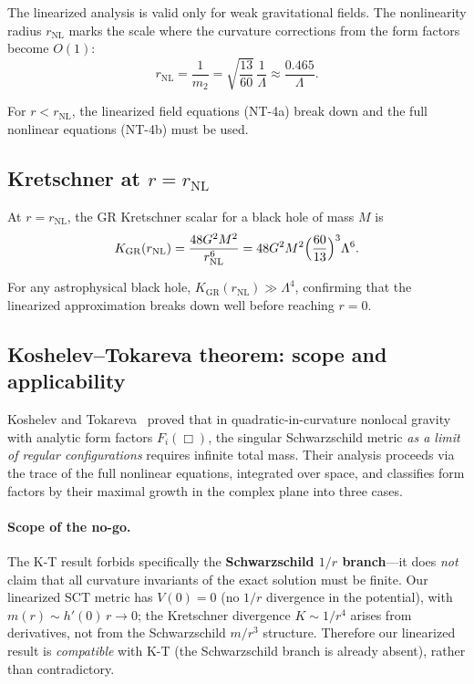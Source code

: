 \documentclass[11pt,a4paper]{article}
\theoremstyle{definition}
\theoremstyle{remark}
\newcommand{\Lam}{\Lambda}
\newcommand{\rNL}{r_{\mathrm{NL}}}
\begin{document}
The linearized analysis is valid only for weak gravitational fields. The nonlinearity
radius $\rNL$ marks the scale where the curvature corrections from the form factors
become $O(1)$:
\begin{equation}
  \rNL = \frac{1}{m_2} = \sqrt{\frac{13}{60}}\,\frac{1}{\Lam} \approx \frac{0.465}{\Lam}.
\end{equation}

For $r < \rNL$, the linearized field equations (NT-4a) break down and the full nonlinear
equations (NT-4b) must be used.

\subsection{Kretschner at $r = \rNL$}

At $r = \rNL$, the GR Kretschner scalar for a black hole of mass $M$ is
\begin{equation}
  K_{\mathrm{GR}}(\rNL) = \frac{48G^2M^2}{\rNL^6}
  = 48G^2M^2\Bigl(\frac{60}{13}\Bigr)^3\Lam^6.
\end{equation}

For any astrophysical black hole, $K_{\mathrm{GR}}(\rNL) \gg \Lam^4$, confirming
that the linearized approximation breaks down well before reaching $r = 0$.

\subsection{Koshelev--Tokareva theorem: scope and applicability}

Koshelev and Tokareva~\cite{KoshelevTokareva2024} proved that in quadratic-in-curvature
nonlocal gravity with analytic form factors $F_i(\Box)$, the singular Schwarzschild
metric \emph{as a limit of regular configurations} requires infinite total mass.
Their analysis proceeds via the trace of the full nonlinear equations, integrated
over space, and classifies form factors by their maximal growth in the complex plane
into three cases.

\paragraph{Scope of the no-go.}
The K-T result forbids specifically the \textbf{Schwarzschild $1/r$ branch}---it does
\emph{not} claim that all curvature invariants of the exact solution must be finite.
Our linearized SCT metric has $V(0) = 0$ (no $1/r$ divergence in the potential), with
$m(r) \sim h'(0)\,r \to 0$; the Kretschner divergence $K \sim 1/r^4$ arises from
derivatives, not from the Schwarzschild $m/r^3$ structure.  Therefore our linearized
result is \emph{compatible} with K-T (the Schwarzschild branch is already absent),
rather than contradictory.
\end{document}
